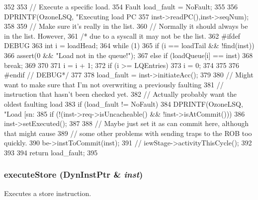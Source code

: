 \begin{DoxyCode}
352 {
353     // Execute a specific load.
354     Fault load_fault = NoFault;
355 
356     DPRINTF(OzoneLSQ, "Executing load PC %
357             inst->readPC(),inst->seqNum);
358 
359     // Make sure it's really in the list.
360     // Normally it should always be in the list.  However,
361     /* due to a syscall it may not be the list.
362 #ifdef DEBUG
363     int i = loadHead;
364     while (1) {
365         if (i == loadTail && !find(inst)) {
366             assert(0 && "Load not in the queue!");
367         } else if (loadQueue[i] == inst) {
368             break;
369         }
370 
371         i = i + 1;
372         if (i >= LQEntries) {
373             i = 0;
374         }
375     }
376 #endif // DEBUG*/
377 
378     load_fault = inst->initiateAcc();
379 
380     // Might want to make sure that I'm not overwriting a previously faulting
381     // instruction that hasn't been checked yet.
382     // Actually probably want the oldest faulting load
383     if (load_fault != NoFault) {
384         DPRINTF(OzoneLSQ, "Load [sn:%
385         if (!(inst->req->isUncacheable() && !inst->isAtCommit())) {
386             inst->setExecuted();
387         }
388         // Maybe just set it as can commit here, although that might cause
389         // some other problems with sending traps to the ROB too quickly.
390         be->instToCommit(inst);
391 //        iewStage->activityThisCycle();
392     }
393 
394     return load_fault;
395 }
\end{DoxyCode}
\hypertarget{classOzoneLWLSQ_aad78b8a37ee5c61e47df58dd39980340}{
\subsubsection[{executeStore}]{ executeStore ({\bf DynInstPtr} \& {\em inst})}}
\label{classOzoneLWLSQ_aad78b8a37ee5c61e47df58dd39980340}
Executes a store instruction. 



